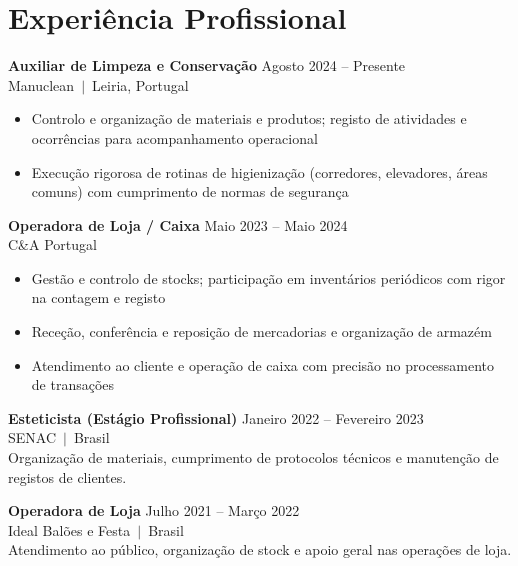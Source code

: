 \documentclass[10pt,a4paper]{article}
\begin{document}
\section{Experiência Profissional}

{\small\bfseries Auxiliar de Limpeza e Conservação}\hfill{\small\color{subtle} Agosto 2024 -- Presente}\\
{\small\color{accent} Manuclean~$|$~Leiria, Portugal}
\begin{itemize}\small
  \item Controlo e organização de materiais e produtos; registo de atividades e ocorrências para acompanhamento operacional
  \item Execução rigorosa de rotinas de higienização (corredores, elevadores, áreas comuns) com cumprimento de normas de segurança
\end{itemize}

\vspace{4pt}
{\small\bfseries Operadora de Loja / Caixa}\hfill{\small\color{subtle} Maio 2023 -- Maio 2024}\\
{\small\color{accent} C\&A Portugal}
\begin{itemize}\small
  \item Gestão e controlo de stocks; participação em inventários periódicos com rigor na contagem e registo
  \item Receção, conferência e reposição de mercadorias e organização de armazém
  \item Atendimento ao cliente e operação de caixa com precisão no processamento de transações
\end{itemize}

\vspace{4pt}
{\small\bfseries Esteticista (Estágio Profissional)}\hfill{\small\color{subtle} Janeiro 2022 -- Fevereiro 2023}\\
{\small\color{accent} SENAC~$|$~Brasil}\\
{\small Organização de materiais, cumprimento de protocolos técnicos e manutenção de registos de clientes.}

\vspace{4pt}
{\small\bfseries Operadora de Loja}\hfill{\small\color{subtle} Julho 2021 -- Março 2022}\\
{\small\color{accent} Ideal Balões e Festa~$|$~Brasil}\\
{\small Atendimento ao público, organização de stock e apoio geral nas operações de loja.}
\end{document}
